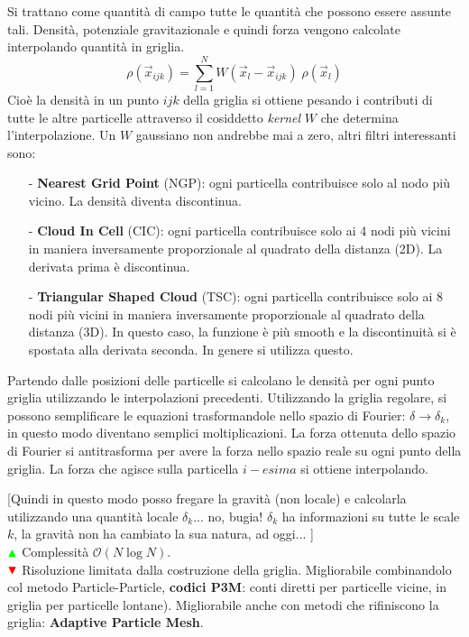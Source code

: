 \begin{example}
 Si trattano come quantità di campo tutte le quantità che possono essere assunte tali. Densità, potenziale gravitazionale e quindi forza vengono calcolate interpolando quantità in griglia. $$ \rho (\vec{x}_{ijk})=\sum_{l=1}^N W(\vec{x}_l - \vec{x}_{ijk}) \; \rho(\vec{x}_l)$$ Cioè la densità in un punto ${ijk}$ della griglia si ottiene pesando i contributi di tutte le altre particelle attraverso il cosiddetto \textit{kernel} $W$ che determina l'interpolazione. Un $W$ gaussiano non andrebbe mai a zero, altri filtri interessanti sono:
 \begin{itemize}
     \item[-] \textbf{Nearest Grid Point} (NGP): ogni particella contribuisce solo al nodo più vicino. La densità diventa discontinua.
     \item[-] \textbf{Cloud In Cell} (CIC): ogni particella contribuisce solo ai 4 nodi più vicini in maniera inversamente proporzionale al quadrato della distanza (2D). La derivata prima è discontinua.
     \item[-] \textbf{Triangular Shaped Cloud} (TSC): ogni particella contribuisce solo ai 8 nodi più vicini in maniera inversamente proporzionale al quadrato della distanza (3D). In questo caso, la funzione è più smooth e la discontinuità si è spostata alla derivata seconda. In genere si utilizza questo.
 \end{itemize}

 Partendo dalle posizioni delle particelle si calcolano le densità per ogni punto griglia utilizzando le interpolazioni precedenti. Utilizzando la griglia regolare, si possono semplificare le equazioni trasformandole nello spazio di Fourier: $\delta\to \delta_k$, in questo modo diventano semplici moltiplicazioni. La forza ottenuta dello spazio di Fourier si antitrasforma per avere la forza nello spazio reale su ogni punto della griglia. La forza che agisce sulla particella $i-esima$ si ottiene interpolando.

[Quindi in questo modo posso fregare la gravità (non locale) e calcolarla utilizzando una quantità locale $\delta_k$... no, bugia! $\delta_k$ ha informazioni su tutte le scale $k$, la gravità non ha cambiato la sua natura, ad oggi... ]
 \\ ${\color{green} \blacktriangle  }$ Complessità $\mathcal{O} (N\log N)$. 
 \\ ${\color{red} \blacktriangledown } $ Risoluzione limitata dalla costruzione della griglia. Migliorabile combinandolo col metodo Particle-Particle, \textbf{codici P3M}: conti diretti per particelle vicine, in griglia per particelle lontane). Migliorabile anche con metodi che rifiniscono la griglia: \textbf{Adaptive Particle Mesh}.

\end{example}  

